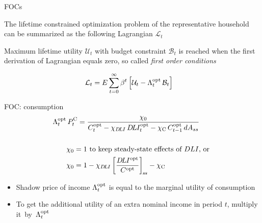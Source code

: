 \begin{frame}{FOCs}
  \begin{itemize}
    {\small
      \item The lifetime constrained optimization problem of the representative household 
    can be summarized as the following Lagrangian $\mathcal{L}_t$
      \item Maximum lifetime utility $\mathcal{U}_t$ with budget constraint $\mathcal{B}_t$ is reached when the first derivation of Lagrangian equals zero, so called \emph{first order conditions}
    }%
    \end{itemize}
     \vspace{-5mm}
   {\small
   \begin{align*}
      \mathcal{L}_t & = E\sum_{t=0}^\infty \beta^t \left[ \mathcal{U}_t - \Lambda^\opt_t \, \mathcal{B}_t \right] %
    \end{align*}
  }%
\end{frame}

\begin{frame}{FOC: consumption}
  \vspace{-5mm}
  \small
  \begin{align*}
    \Lambda^\opt_t&\,P^\cc_t = \frac{\chi_0}{C^\opt_t - \chi_{\DLI}\,\DLI_t^\opt - \chi_\cc \,  C^\opt_{t-1}\,dA_{ss} } \\[5mm]
   &\chi_0 = 1 \text{ to keep steady-state effects of $DLI$, or } \\
   &\chi_0 = 1-\chi_{\DLI}\,\sst{\left[\frac{\DLI^\opt}{C^\opt}\right]} - \chi_\cc
  \end{align*}
  \begin{itemize}
    \item Shadow price of income $\Lambda^{\text{opt}}_t$ is equal to the marginal utility of consumption
    \item To get the additional utility of an extra nominal income in period $t$, multiply it~by~$\Lambda^{\text{opt}}_t$
  \end{itemize}
\end{frame}


